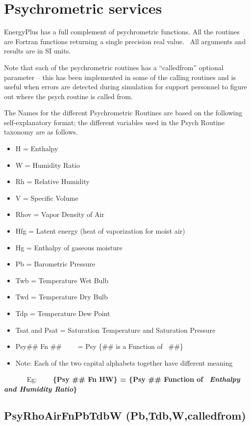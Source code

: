 \section{Psychrometric services}\label{psychrometric-services}

EnergyPlus has a full complement of psychrometric functions. All the routines are Fortran functions returning a single precision real value.~ All arguments and results are in SI units.

Note that each of the psychrometric routines has a ``calledfrom'' optional parameter -- this has been implemented in some of the calling routines and is useful when errors are detected during simulation for support personnel to figure out where the psych routine is called from.

The Names for the different Psychrometric Routines are based on the following self-explanatory format; the different variables used in the Psych Routine taxonomy are as follows.

\begin{itemize}
\tightlist
\item
  H = Enthalpy
\item
  W = Humidity Ratio
\item
  Rh = Relative Humidity
\item
  V = Specific Volume
\item
  Rhov = Vapor Density of Air
\item
  Hfg = Latent energy (heat of vaporization for moist air)
\item
  Hg = Enthalpy of gaseous moisture
\item
  Pb = Barometric Pressure
\item
  Twb = Temperature Wet Bulb
\item
  Twd = Temperature Dry Bulb
\item
  Tdp = Temperature Dew Point
\item
  Tsat and Psat = Saturation Temperature and Saturation Pressure
\item
  Psy\#\# Fn \#\#~~~~ = Psy \{\#\# is a Function of~ \#\#\}
\item
  Note: Each of the two capital alphabets together have different meaning
\end{itemize}

~~~~~~ Eg:~~~~ \textbf{\{Psy \#\# Fn HW\} = \{Psy \#\# Function of~ \emph{Enthalpy and Humidity Ratio}\}}

\subsection{PsyRhoAirFnPbTdbW (Pb,Tdb,W,calledfrom)}\label{psyrhoairfnpbtdbw-pbtdbwcalledfrom}

